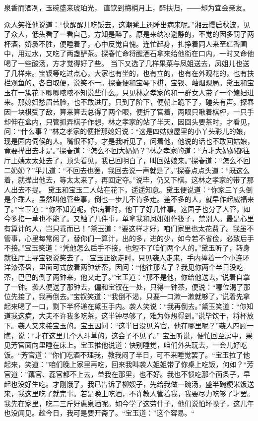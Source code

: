 \documentclass[12pt,oneside]{book}
\begin{document}
泉香而酒冽，玉碗盛来琥珀光，
直饮到梅梢月上，醉扶归，――却为宜会亲友。

众人笑推他说道：“快醒醒儿吃饭去，这潮凳上还睡出病来呢。”湘云慢启秋波，见了众人，低头看了一看自己，方知是醉了。原是来纳凉避静的，不觉的因多罚了两杯酒，娇袅不胜，便睡着了，心中反觉自愧。连忙起身，扎挣着同人来至红香圃中，用过水，又吃了两盏酽茶。探春忙命将醒酒石拿来给他衔在口内，一时又命他喝了一些酸汤，方才觉得好了些。
当下又选了几样果菜与凤姐送去，凤姐儿也送了几样来。宝钗等吃过点心，大家也有坐的，也有立的，也有在外观花的，也有扶栏观鱼的，各自取便，说笑不一。探春便和宝琴下棋，宝钗、岫烟观局。黛玉和宝玉在一簇花下唧唧哝哝不知说些什么。只见林之孝家的和一群女人带了一个媳妇进来。那媳妇愁眉苦脸，也不敢进厅，只到了阶下，便朝上跪下了，碰头有声。探春因一块棋受了敌，算来算去总得了两个眼，便折了官着，两眼只瞅着棋枰，一只手却伸在盒内，只管抓弄棋子作想，林之孝家的站了半天，因回头要茶时，才看见，问：“什么事？”林之孝家的便指那媳妇说：“这是四姑娘屋里的小丫头彩儿的娘，现是园内伺候的人。嘴很不好，才是我听见了，问着他，他说的话也不敢回姑娘，竟要撵出去才是。”探春道：“怎么不回大奶奶？”林之孝家的道：“方才大奶奶都往厅上姨太太处去了，顶头看见，我已回明白了，叫回姑娘来。”探春道：“怎么不回二奶奶？”平儿道：“不回去也罢，我回去说一声就是了。”探春点点头道：“既这么着，就撵出他去，等太太来了，再回定夺。”说毕，仍又下棋。这林之孝家的带了那人出去不提。
黛玉和宝玉二人站在花下，遥遥知意。黛玉便说道：“你家三丫头倒是个乖人。虽然叫他管些事，倒也一步儿不肯多走。差不多的人，就早作起威福来了。”宝玉道：“你不知道呢。你病着时，他干了好几件事。这园子也分了人管，如今多掐一草也不能了。又触了几件事，单拿我和凤姐姐作筏子，禁别人。最是心里有算计的人，岂只乖而已！”黛玉道：“要这样才好，咱们家里也太花费了。我虽不管事，心里每常闲了，替你们一算计，出的多，进的少，如今若不省俭，必致后手不接。”宝玉笑道：“凭他怎么后手不接，也短不了咱们两个人的。”黛玉听了，转身就往厅上寻宝钗说笑去了。
宝玉正欲走时，只见袭人走来，手内捧着一个小连环洋漆茶盘，里面可式放着两钟新茶，因问：“他往那去了？我见你两个半日没吃茶，巴巴的倒了两钟来，他又走了。”宝玉道：“那不是他，你给他送去。”说着自拿了一钟。袭人便送了那钟去，偏和宝钗在一处，只得一钟茶，便说：“哪位渴了那位先接了，我再倒去。”宝钗笑道：“我倒不渴，只要一口漱一漱就够了。”说着先拿起来喝了一口，剩下半杯递在黛玉手内。袭人笑说：“我再倒去。”黛玉笑道：“你知道我这病，大夫不许我多吃茶，这半钟尽够了，难为你想得到。”说毕饮干，将杯放下。袭人又来接宝玉的。宝玉因问：“这半日没见芳官，他在哪里呢？”袭人四顾一瞧，说：“才在这里几个人斗草的，这会子不见了。”
宝玉听说，便忙回至房中，果见芳官面向里睡在床上。宝玉推他说道：快别睡觉，咱们外头玩去，一会儿好吃饭。“芳官道：”你们吃酒不理我，教我闷了半日，可不来睡觉罢了。“宝玉拉了他起来，笑道：”咱们晚上家里再吃，回来我叫袭人姐姐带了你桌上吃饭，何如？“芳官道：”藕官、蕊官都不上去，单我在那里，也不好。我也不惯吃那个面条子，早起也没好生吃。才刚饿了，我已告诉了柳嫂子，先给我做一碗汤，盛半碗粳米饭送来，我这里吃了就完事。若是晚上吃酒，不许教人管着我，我要尽力吃够了才罢。我先在家里，吃二三斤好惠泉酒呢。如今学了这劳什子，他们说怕坏嗓子，这几年也没闻见。趁今日，我可是要开斋了。“宝玉道：”这个容易。“
\end{document}
